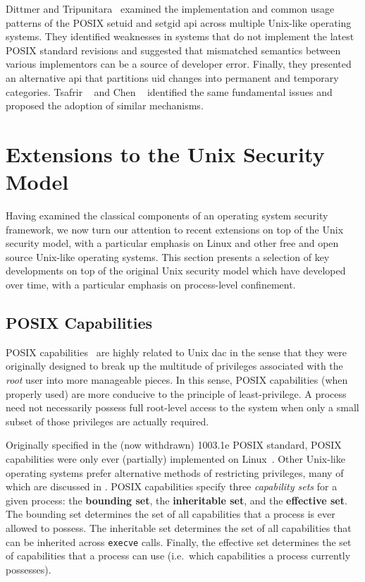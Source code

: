 \documentclass[
  fontsize=12pt,
  titlepage=firstiscover,
  paper=letter,
oneside,
  cleardoublepage=plain,
  parskip=half-,
  DIV=10,
  parindent,
  appendixprefix,
  chapterprefix,
  listof=totoc,
]{scrbook}
\begin{document}
Dittmer and Tripunitara~\cite{dittmer2014_setuid} examined the implementation and common
usage patterns of the POSIX setuid and setgid \gls{api} across multiple Unix-like operating
systems. They identified weaknesses in systems that do not implement the latest POSIX
standard revisions and suggested that mismatched semantics between various implementors
can be a source of developer error. Finally, they presented an alternative \gls{api} that
partitions \gls{uid} changes into permanent and temporary categories. Tsafrir
\etal~\cite{tsafrir2008_setuid} and Chen \etal~\cite{chen2002_setuid} identified the same
fundamental issues and proposed the adoption of similar mechanisms.






\section{Extensions to the Unix Security Model}\label{s:security-extensions}

Having examined the classical components of an operating system security framework, we now
turn our attention to recent extensions on top of the Unix security model, with
a particular emphasis on Linux and other free and open source Unix-like operating systems.
This section presents a selection of key developments on top of the original Unix security
model which have developed over time, with a particular emphasis on process-level
confinement.





\subsection{POSIX Capabilities}

POSIX capabilities~\cite{posix_capabilities, corbet2006_capabities_a,
corbet2006_capabities_b} are highly related to Unix \gls{dac} in the sense that they were
originally designed to break up the multitude of privileges associated with the
\textit{root} user into more manageable pieces. In this sense, POSIX capabilities (when
properly used) are more conducive to the principle of least-privilege. A process need not
necessarily possess full root-level access to the system when only a small subset of those
privileges are actually required.

Originally specified in the (now withdrawn) 1003.1e POSIX standard, POSIX capabilities
were only ever (partially) implemented on Linux~\cite{anderson2017_comparison}. Other
Unix-like operating systems prefer alternative methods of restricting privileges, many of
which are discussed in . POSIX capabilities specify three
\textit{capability sets} for a given process: the \textbf{bounding set}, the
\textbf{inheritable set}, and the \textbf{effective set}. The bounding set determines the
set of all capabilities that a process is ever allowed to possess. The inheritable set
determines the set of all capabilities that can be inherited across \texttt{execve} calls.
Finally, the effective set determines the set of capabilities that a process can use
(i.e.\ which capabilities a process currently possesses).
\end{document}
